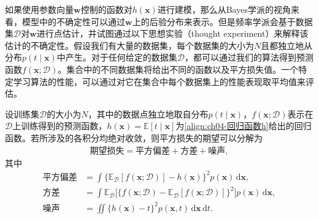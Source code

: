 \documentclass[../../main.tex]{subfiles}
\begin{document}
如果使用参数向量$\boldsymbol{w}$控制的函数对$h(\boldsymbol{x})$进行建模，那么从Bayes学派的视角来看，模型中的不确定性可以通过$\boldsymbol{w}$上的后验分布来表示。但是频率学派会基于数据集$\mathcal{D}$对$\boldsymbol{w}$进行点估计，并试图通过以下思想实验（thought experiment）来解释该估计的不确定性。假设我们有大量的数据集，每个数据集的大小为$N$且都独立地从分布$p(t\mid\boldsymbol{x})$中产生。对于任何给定的数据集$\mathcal{D}$，都可以通过我们的算法得到预测函数$f(\boldsymbol{x};\mathcal{D})$。集合中的不同数据集将给出不同的函数以及平方损失值。一个特定学习算法的性能，可以通过对它在集合中每个数据集上的性能表现取平均值来评估。

\begin{theorem}[偏差-方差分解]\label{theorem:ch04-偏差方差分解}
设训练集$\mathcal{D}$的大小为$N$，其中的数据点独立地取自分布$p(t\mid\boldsymbol{x})$，$f(\boldsymbol{x};\mathcal{D})$表示在$\mathcal{D}$上训练得到的预测函数，$h(\boldsymbol{x})=\mathbb{E}[t\mid\boldsymbol{x}]$为\eqref{align:ch04-回归函数h}给出的回归函数。若所涉及的各积分均绝对收敛，则平方损失的期望可以分解为
\begin{align}
  \text{期望损失}=\text{平方偏差}+\text{方差}+\text{噪声},
  \label{align:ch04-偏差方差噪声}
\end{align}
其中
\begin{align}
  \text{平方偏差}&=\int\bigl\{\mathbb{E}_{\mathcal{D}}[f(\boldsymbol{x};\mathcal{D})]-h(\boldsymbol{x})\bigr\}^2p(\boldsymbol{x})\,\mathrm{d}\boldsymbol{x},
  \label{align:ch04-平方偏差}\\
  \text{方差}&=\int\mathbb{E}_{\mathcal{D}}\bigl[\{f(\boldsymbol{x};\mathcal{D})-\mathbb{E}_{\mathcal{D}}[f(\boldsymbol{x};\mathcal{D})]\}^2\bigr]p(\boldsymbol{x})\,\mathrm{d}\boldsymbol{x},
  \label{align:ch04-方差}\\
  \text{噪声}&=\iint\{h(\boldsymbol{x})-t\}^2p(\boldsymbol{x},t)\,\mathrm{d}\boldsymbol{x}\,\mathrm{d}t.
  \label{align:ch04-不可约噪声}
\end{align}
\end{theorem}
\end{document}
